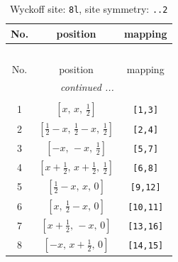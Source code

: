 \documentclass[fleqn,8pt]{jsarticle}
\begin{document}
\begin{longtable}{ccc}
\caption{Wyckoff site: {\tt 8l}, site symmetry: {\tt ..2}}
 \\
 \hline \hline
No. & position & mapping \\ \hline \endfirsthead

\multicolumn{2}{l}{\tablename\ \thetable{}} \\
 \hline \hline
No. & position & mapping \\ \hline \endhead

 \hline \hline
\multicolumn{2}{r}{\footnotesize\it continued ...} \\ \endfoot

 \hline \hline
\multicolumn{2}{r}{} \\ \endlastfoot

1 & $\left[ x,\, x,\, \frac{1}{2} \right]$ & {\tt [1,3]} \\ \hline
2 & $\left[ \frac{1}{2} - x,\, \frac{1}{2} - x,\, \frac{1}{2} \right]$ & {\tt [2,4]} \\ \hline
3 & $\left[ - x,\, - x,\, \frac{1}{2} \right]$ & {\tt [5,7]} \\ \hline
4 & $\left[ x + \frac{1}{2},\, x + \frac{1}{2},\, \frac{1}{2} \right]$ & {\tt [6,8]} \\ \hline
5 & $\left[ \frac{1}{2} - x,\, x,\, 0 \right]$ & {\tt [9,12]} \\ \hline
6 & $\left[ x,\, \frac{1}{2} - x,\, 0 \right]$ & {\tt [10,11]} \\ \hline
7 & $\left[ x + \frac{1}{2},\, - x,\, 0 \right]$ & {\tt [13,16]} \\ \hline
8 & $\left[ - x,\, x + \frac{1}{2},\, 0 \right]$ & {\tt [14,15]} \\
\end{longtable}
\renewcommand{\arraystretch}{1.2}
\end{document}
